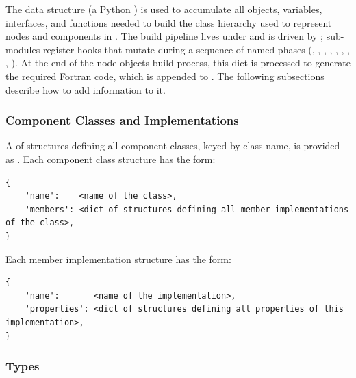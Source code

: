 The  data structure (a Python ) is used to accumulate all objects, variables, interfaces, and functions needed to build the class hierarchy used to represent nodes and components in \glc. The build pipeline lives under  and is driven by ; sub-modules register hooks that mutate  during a sequence of named phases (, , , , , , , , ). At the end of the node objects build process, this dict is processed to generate the required Fortran code, which is appended to . The following subsections describe how to add information to it.

\subsubsection{Component Classes and Implementations}

A  of structures defining all component classes, keyed by class name, is provided as . Each component class structure has the form:
\begin{verbatim}
{
    'name':    <name of the class>,
    'members': <dict of structures defining all member implementations of the class>,
}
\end{verbatim}
Each member implementation structure has the form:
\begin{verbatim}
{
    'name':       <name of the implementation>,
    'properties': <dict of structures defining all properties of this implementation>,
}
\end{verbatim}

\subsubsection{Types}\label{sec:buildHierarchyTypes}

